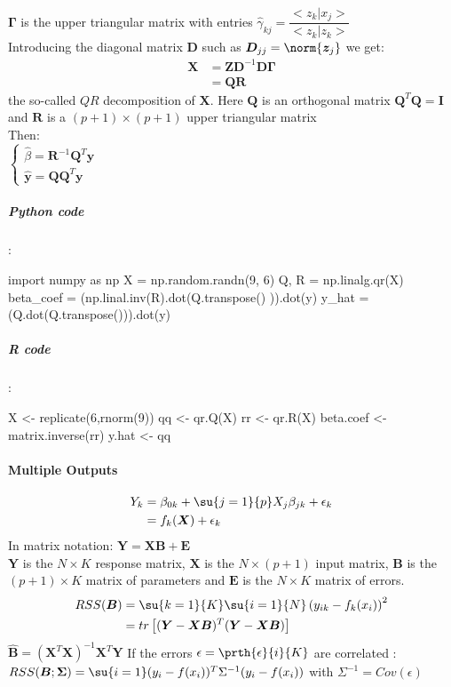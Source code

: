 $\bm{\Gamma}$ is the upper triangular matrix with entries 
$\hat{\gamma}_{kj}=\dfrac{<z_{k}|x_{j}>}{<z_{k}|z_{k}>}$\\
Introducing the diagonal matrix $\bm{D}$ such as $\bm{D}_{jj} = 
\norm{\bm{z}_{j}}$ we get: 
\begin{align*}
	\bm{X} &= \bm{Z}\bm{D}^{-1}\bm{D}\bm{\Gamma}\\
	&= \bm{Q}\bm{R}
\end{align*}
the so-called $QR$ decomposition of $\bm{X}$. Here $\bm{Q}$ is an 
orthogonal matrix $\bm{Q}^{T}\bm{Q}=\bm{I}$ and $\bm{R}$ is a 
$(p+1)\times(p+1)$ upper triangular matrix\\
Then: \\
$
\begin{cases}
	\hat{\beta} = \bm{R}^{-1}\bm{Q}^{T}\bm{y}\\
	\hat{\bm{y}}= \bm{Q}\bm{Q}^{T}\bm{y}
\end{cases}
$
\subparagraph{Python code}:
\begin{python}
import numpy as np
X = np.random.randn(9, 6)
Q, R = np.linalg.qr(X)
beta_coef = (np.linal.inv(R).dot(Q.transpose()
    )).dot(y)
y_hat = (Q.dot(Q.transpose())).dot(y)
\end{python}

\subparagraph{R code}:
\begin{rcode}[deletekeywords={beta, coef, hat}]
X <- replicate(6,rnorm(9))
qq <- qr.Q(X)
rr <- qr.R(X)
beta.coef <- matrix.inverse(rr)%
y.hat <- qq%
\end{rcode}

\paragraph{Multiple Outputs}
\begin{align*}
	Y_{k} &= \beta_{0k} + \su{{j=1}}{p}X_{j}\beta_{jk}+\epsilon_{k}\\
&= f_{k}(\bm{X})+\epsilon_{k}
\end{align*}
In matrix notation: $\bm{Y}=\bm{X}\bm{B} + \bm{E}$\\
$\bm{Y}$ is the $N\times K$ response matrix, $\bm{X}$ is the 
$N\times(p+1)$ input matrix, $\bm{B}$ is the $(p+1)\times K$ matrix of
parameters and $\bm{E}$ is the $N\times K$ matrix of errors.\\
\begin{align*}
	RSS(\bm{B}) &= \su{{k=1}}{K}\su{{i=1}}{N}\left(y_{ik}-f_{k}(x_{i})\right)^{2}\\
	&= tr\left[ (\bm{Y}-\bm{XB})^{T}(\bm{Y}-\bm{XB}) \right]
\end{align*}
$\hat{\bm{B}}=(\bm{X}^{T}\bm{X})^{-1}\bm{X}^{T}\bm{Y}$
If the errors $\epsilon=\prth{\epsilon}{i}{K}$ are correlated :
$RSS(\bm{B}; \bm{\Sigma})=\su{{i=1}}(y_{i}-f(x_{i}))^{T}\Sigma^{-1}(y_{i}-f(x_{i}))$
with $\Sigma^{-1}=Cov(\epsilon)$


